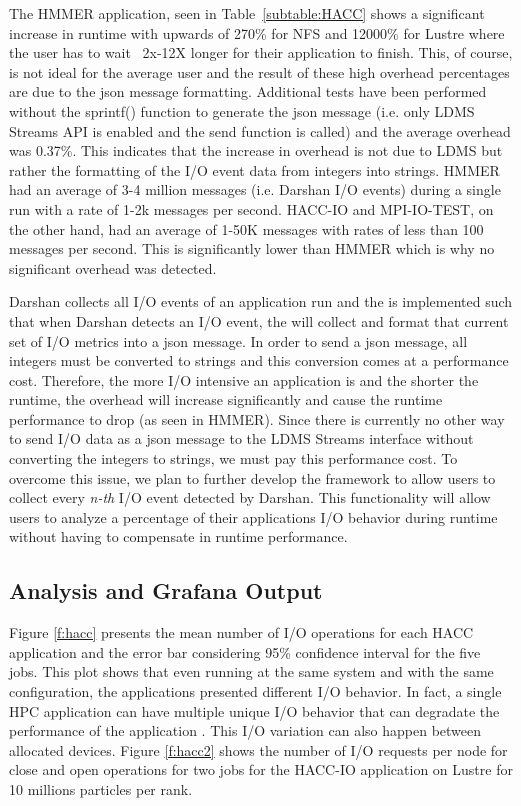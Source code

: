 The HMMER application, seen in Table~\ref{subtable:HACC} shows a significant increase in runtime with upwards of 270\% for NFS and 12000\% for Lustre where the user has to wait ~2x-12X longer for their application to finish. This, of course, is not ideal for the average user and the result of these high overhead percentages are due to the json message formatting. Additional tests have been performed without the sprintf() function to generate the json message (i.e. only LDMS Streams API is enabled and the \connector send function is called) and the average overhead was 0.37\%. This indicates that the increase in overhead is not due to LDMS but rather the formatting of the I/O event data from integers into strings. HMMER had an average of 3-4 million messages (i.e. Darshan I/O events) during a single run with a rate of 1-2k messages per second. HACC-IO and MPI-IO-TEST, on the other hand, had an average of 1-50K messages with rates of less than 100 messages per second. This is significantly lower than HMMER which is why no significant overhead was detected. 

Darshan collects all I/O events of an application run and the \connector is implemented such that when Darshan detects an I/O event, the \connector will collect and format that current set of I/O metrics into a json message. In order to send a json message, all integers must be converted to strings and this conversion comes at a performance cost. Therefore, the more I/O intensive an application is and the shorter the runtime, the overhead will increase significantly and cause the runtime performance to drop (as seen in HMMER). Since there is currently no other way to send I/O data as a json message to the LDMS Streams interface without converting the integers to strings, we must pay this performance cost. To overcome this issue, we plan to further develop the \Darshan framework to allow users to collect every \emph{n-th} I/O event detected by Darshan. This functionality will allow users to analyze a percentage of their applications I/O behavior during runtime without having to compensate in runtime performance.     

\subsection{Analysis and Grafana Output}
Figure \ref{f:hacc} presents the mean number of I/O operations for
each HACC application and the error bar considering 95\% confidence
interval for the five jobs. This plot shows that even running at the
same system and with the same configuration, the applications
presented different I/O behavior. In fact, a single HPC application
can have multiple unique I/O behavior that can degradate the
performance of the application \cite{costa2021}. This I/O variation
can also happen between allocated devices. Figure \ref{f:hacc2} shows
the number of I/O requests per node for close and open operations for
two jobs for the HACC-IO application on Lustre for 10 millions
particles per rank.

